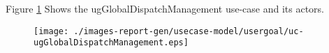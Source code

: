 Figure \ref{fig:lu.uni.lassy.excalibur.group09.spec-RE-UCD-uc-ugGlobalDispatchManagement}
Shows the ugGlobalDispatchManagement use-case and its actors.

\begin{figure}[htbp]
\begin{center}

\texttt{[image: ./images-report-gen/usecase-model/usergoal/uc-ugGlobalDispatchManagement.eps]}
\end{center}
\caption[lu.uni.lassy.excalibur.group09.spec Use Case Diagram: uc-ugGlobalDispatchManagement]{}
\label{fig:lu.uni.lassy.excalibur.group09.spec-RE-UCD-uc-ugGlobalDispatchManagement}
\end{figure}
\vspace{0.5cm}
